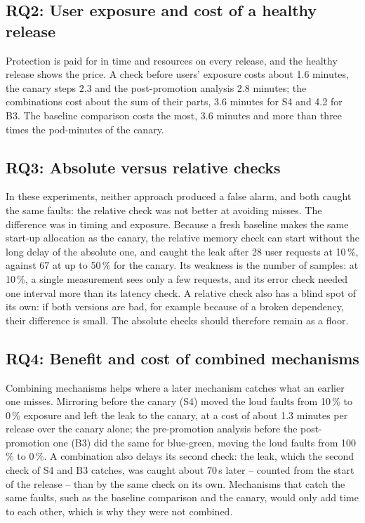 \subsection{RQ2: User exposure and cost of a healthy release}
\label{sec:EvalRQ2}
Protection is paid for in time and resources on every release, and the healthy release shows the price. A check before users' exposure costs about 1.6 minutes, the canary steps 2.3 and the post-promotion analysis 2.8 minutes; the combinations cost about the sum of their parts, 3.6 minutes for S4 and 4.2 for B3. The baseline comparison costs the most, 3.6 minutes and more than three times the pod-minutes of the canary.

\subsection{RQ3: Absolute versus relative checks}
\label{sec:EvalRQ3}
In these experiments, neither approach produced a false alarm, and both caught the same faults: the relative check was not better at avoiding misses. The difference was in timing and exposure. Because a fresh baseline makes the same start-up allocation as the canary, the relative memory check can start without the long delay of the absolute one, and caught the leak after 28 user requests at 10\,\%, against 67 at up to 50\,\% for the canary. Its weakness is the number of samples: at 10\,\%, a single measurement sees only a few requests, and its error check needed one interval more than its latency check. A relative check also has a blind spot of its own: if both versions are bad, for example because of a broken dependency, their difference is small. The absolute checks should therefore remain as a floor.

\subsection{RQ4: Benefit and cost of combined mechanisms}
\label{sec:EvalRQ4}
Combining mechanisms helps where a later mechanism catches what an earlier one misses. Mirroring before the canary (S4) moved the loud faults from 10\,\% to 0\,\% exposure and left the leak to the canary, at a cost of about 1.3 minutes per release over the canary alone; the pre-promotion analysis before the post-promotion one (B3) did the same for blue-green, moving the loud faults from 100\,\% to 0\,\%. A combination also delays its second check: the leak, which the second check of S4 and B3 catches, was caught about 70\,s later -- counted from the start of the release -- than by the same check on its own. Mechanisms that catch the same faults, such as the baseline comparison and the canary, would only add time to each other, which is why they were not combined.

